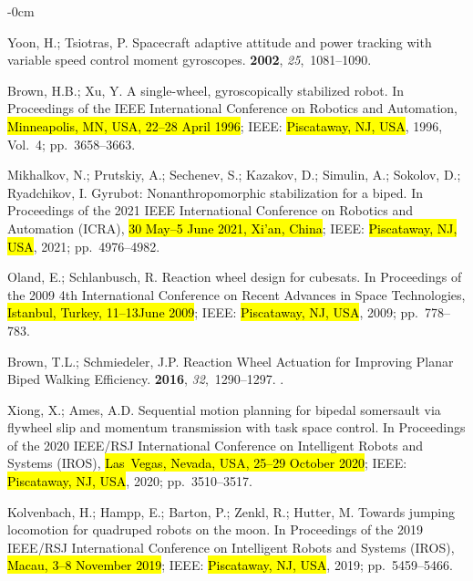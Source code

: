 \documentclass[sensors,article,accept,pdftex,moreauthors]{Definitions/mdpi}
\begin{document}
\begin{adjustwidth}{-\extralength}{0cm}
\begin{thebibliography}{999}
Yoon, H.; Tsiotras, P.
\newblock Spacecraft adaptive attitude and power tracking with variable speed
  control moment gyroscopes.
 {\bf 2002}, {\em
  25},~1081--1090.

Brown, H.B.; Xu, Y.
\newblock A single-wheel, gyroscopically stabilized robot.
\newblock In Proceedings of the  IEEE International Conference on
  Robotics and Automation, \hl{Minneapolis, MN, USA, 22--28 April 1996}; IEEE: \hl{Piscataway, NJ, USA},  1996, Vol.~4; pp.~3658--3663.

Mikhalkov, N.; Prutskiy, A.; Sechenev, S.; Kazakov, D.; Simulin, A.; Sokolov,
  D.; Ryadchikov, I.
\newblock Gyrubot: Nonanthropomorphic stabilization for a biped.
\newblock In Proceedings of the 2021 IEEE International Conference on Robotics
  and Automation (ICRA), \hl{30 May--5 June 2021, Xi'an, China}; IEEE: \hl{Piscataway, NJ, USA},  2021; pp.~4976--4982.

Oland, E.; Schlanbusch, R.
\newblock Reaction wheel design for cubesats.
\newblock In Proceedings of the 2009 4th International Conference on Recent
  Advances in Space Technologies, \hl{Istanbul, Turkey, 11--13June 2009}; IEEE: \hl{Piscataway, NJ, USA},  2009; pp.~778--783.

Brown, T.L.; Schmiedeler, J.P.
\newblock Reaction Wheel Actuation for Improving Planar Biped Walking
  Efficiency.
 {\bf 2016}, {\em 32},~1290--1297.
.

Xiong, X.; Ames, A.D.
\newblock Sequential motion planning for bipedal somersault via flywheel slip
  and momentum transmission with task space control.
\newblock In Proceedings of the 2020 IEEE/RSJ International Conference on
  Intelligent Robots and Systems (IROS), \hl{Las~Vegas, Nevada, USA, 25--29 October 2020}; IEEE: \hl{Piscataway, NJ, USA},  2020; pp.~3510--3517.

Kolvenbach, H.; Hampp, E.; Barton, P.; Zenkl, R.; Hutter, M.
\newblock Towards jumping locomotion for quadruped robots on the moon.
\newblock In Proceedings of the 2019 IEEE/RSJ International Conference on
  Intelligent Robots and Systems (IROS), \hl{Macau, 3--8 November 2019}; IEEE: \hl{Piscataway, NJ, USA},  2019; pp.~5459--5466.


\end{thebibliography}
\end{adjustwidth}
\end{document}
